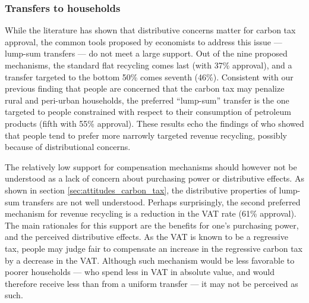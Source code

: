 \documentclass[english,5p,authoryear]{elsarticle}
\begin{document}
        \subsubsection{Transfers to households}
While the literature has shown that distributive concerns matter for carbon tax approval, the common tools proposed by economists to address this issue --- lump-sum transfers --- do not meet a large support. Out of the nine proposed mechanisms, the standard flat recycling comes last (with 37\% approval), and a transfer targeted to the bottom 50\% comes seventh (46\%). Consistent with our previous finding that people are concerned that the carbon tax may penalize rural and peri-urban households, the preferred ``lump-sum'' transfer is the one targeted to people constrained with respect to their consumption of petroleum products (fifth with 55\% approval). These results echo the findings of \citet{kallbekken_et_al_2011} who showed that people tend to prefer more narrowly targeted revenue recycling, possibly because of distributional concerns. %

The relatively low support for compensation mechanisms should however not be understood as a lack of concern about purchasing power or distributive effects. As shown in section \ref{sec:attitudes_carbon_tax}, the distributive properties of lump-sum transfers are not well understood. Perhaps surprisingly, the second preferred mechanism for revenue recycling is a reduction in the VAT rate (61\% approval). The main rationales for this support are the benefits for one's purchasing power, and the perceived distributive effects. As the VAT is known to be a regressive tax, people may judge fair to compensate an increase in the regressive carbon tax by a decrease in the VAT. Although such mechanism would be less favorable to poorer households --- who spend less in VAT in absolute value, and would therefore receive less than from a uniform transfer --- it may not be perceived as such. %

\end{document}
